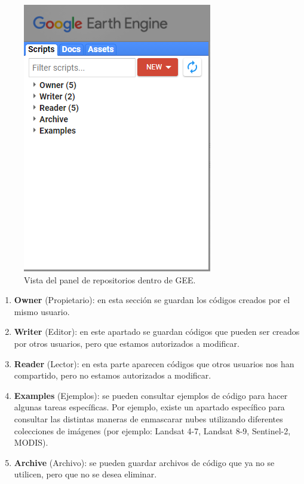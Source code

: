 \documentclass[
  12pt,
  letterpaper,
  twoside]{book}
\providecommand{\tightlist}{%
  \setlength{\itemsep}{0pt}\setlength{\parskip}{0pt}}
\begin{document}
\begin{figure}[H]

{\centering \includegraphics[width=0.6\linewidth]{Img/left_panel} 

}

\caption{Vista del panel de repositorios dentro de GEE.}\label{fig:f26}
\end{figure}

\begin{enumerate}
\def\labelenumi{\arabic{enumi}.}
\tightlist
\item
  \textbf{Owner} (Propietario): en esta sección se guardan los códigos creados por el mismo usuario.
\item
  \textbf{Writer} (Editor): en este apartado se guardan códigos que pueden ser creados por otros usuarios, pero que estamos autorizados a modificar.
\item
  \textbf{Reader} (Lector): en esta parte aparecen códigos que otros usuarios nos han compartido, pero no estamos autorizados a modificar.
\item
  \textbf{Examples} (Ejemplos): se pueden consultar ejemplos de código para hacer algunas tareas específicas. Por ejemplo, existe un apartado específico para consultar las distintas maneras de enmascarar nubes utilizando diferentes colecciones de imágenes (por ejemplo: Landsat 4-7, Landsat 8-9, Sentinel-2, MODIS).
\item
  \textbf{Archive} (Archivo): se pueden guardar archivos de código que ya no se utilicen, pero que no se desea eliminar.
\end{enumerate}
\end{document}
